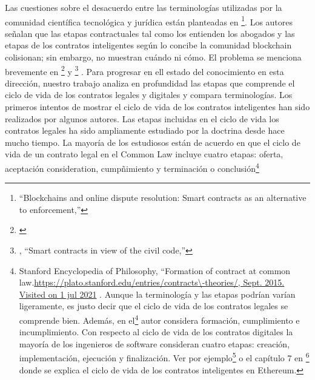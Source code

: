 \documentclass[12pt]{report} %
\begin{document}
\begin{itemize}
Las cuestiones sobre el desacuerdo entre las terminologías utilizadas por la comunidad científica tecnológica y jurídica están planteadas en \footnote{\cite{Riikka2016}“Blockchains and online dispute resolution: Smart contracts as an alternative to enforcement,” }. Los autores señalan que las etapas contractuales tal como los entienden los abogados y las etapas de los contratos inteligentes según lo concibe la comunidad blockchain colisionan; sin embargo, no muestran cuándo ni cómo. El problema se menciona brevemente en \footnote{\cite{Christopher2019}} y \footnote{\cite{Monika2019}, “Smart contracts in view of the civil code,” } . Para progresar en ell estado del conocimiento en esta dirección, nuestro trabajo analiza en profundidad las etapas que comprende el ciclo de vida de los contratos legales y digitales y compara terminologías. Los primeros intentos de mostrar  el ciclo de vida de los contratos inteligentes han sido realizados por algunos autores. Las etapas incluidas en el ciclo de vida los contratos legales ha sido ampliamente estudiado por la doctrina desde hace mucho tiempo. La mayoría de los estudiosos están de acuerdo en que el ciclo de vida de un contrato legal en el Common Law incluye cuatro etapas: oferta, aceptación consideration, cumpñimiento y terminación o conclusión\footnote{Stanford Encyclopedia of Philosophy, “Formation of contract at common law.\url{https://plato.stanford.edu/entries/contracts\-theories/, Sept. 2015. Visited on 1 jul 2021} . Aunque la terminología y las etapas podrían varían ligeramente, es justo decir que el ciclo de vida de los contratos legales se comprende bien. Además, en  el\footnote{\cite{MaxRaskin2017}The law and legality of smart contracts,” } autor considera formación, cumplimiento e incumplimiento. Con respecto al ciclo de vida de los contratos digitales la mayoría de los ingenieros de software consideran cuatro etapas: creación, implementación, ejecución y finalización. Ver por ejemplo\footnote{\cite{Zibin2019} , “An overview on smart contracts: Challenges, advances and platforms.” }  o el capítulo 7 en \footnote{\cite{AndreasAntonopoulos2018}Mastering Ethereum} donde se explica el ciclo de vida de los contratos inteligentes en Ethereum.

}
\end{itemize}
\end{document}
